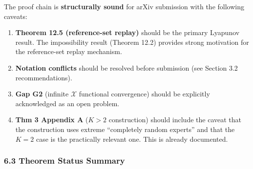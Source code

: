 \documentclass[
  12pt,
]{article}
\begin{document}
The proof chain is \textbf{structurally sound} for arXiv submission with
the following caveats:

\begin{enumerate}
\def\labelenumi{\arabic{enumi}.}
\item
  \textbf{Theorem 12.5 (reference-set replay)} should be the primary
  Lyapunov result. The impossibility result (Theorem 12.2) provides
  strong motivation for the reference-set replay mechanism.
\item
  \textbf{Notation conflicts} should be resolved before submission (see
  Section 3.2 recommendations).
\item
  \textbf{Gap G2} (infinite \(\mathcal{X}\) functional convergence)
  should be explicitly acknowledged as an open problem.
\item
  \textbf{Thm 3 Appendix A} (\(K>2\) construction) should include the
  caveat that the construction uses extreme ``completely random
  experts'' and that the \(K=2\) case is the practically relevant one.
  This is already documented.
\end{enumerate}

\subsubsection{6.3 Theorem Status Summary}\label{theorem-status-summary}
\end{document}
